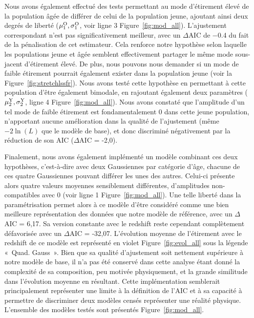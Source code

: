 \documentclass[../main/main.tex]{subfiles}
\begin{document}
Nous avons également effectué des tests permettant au mode d'étirement élevé de
la population âgée de différer de celui de la population jeune, ajoutant ainsi
deux degrés de liberté ($\mu_1^{\rm O}, \sigma_1^{\rm O}$, voir ligne 3
Figure~\ref{fig:mod_all}). L'ajustement correspondant n'est pas
significativement meilleur, avec un $\Delta$AIC de \num{-0.4} du fait de la
pénalisation de cet estimateur. Cela renforce notre hypothèse selon laquelle les
populations jeune et âgée semblent effectivement partager le même mode
sous-jacent d'étirement élevé. De plus, nous pouvons nous demander si un mode de
faible étirement pourrait également exister dans la population jeune (voir la
Figure~\ref{fig:stretchlssfr}). Nous avons testé cette hypothèse en permettant à
cette population d'être également bimodale, en rajoutant également deux
paramètres ($\mu_2^{\rm Y}, \sigma_2^{\rm Y}$, ligne 4
Figure~\ref{fig:mod_all}). Nous avons constaté que l'amplitude d'un tel mode de
faible étirement est fondamentalement 0 dans cette jeune population, n'apportant
aucune amélioration dans la qualité de l'ajustement (même $-2\ln(L)$ que le
modèle de base), et donc discriminé négativement par la réduction de son AIC
($\Delta$AIC = -2,0).

Finalement, nous avons également implémenté un modèle combinant ces deux
hypothèses, c'est-à-dire avec deux Gaussiennes par catégorie d'âge, chacune de
ces quatre Gaussiennes pouvant différer les unes des autres. Celui-ci présente
alors quatre valeurs moyennes sensiblement différentes, d'amplitudes
non-compatibles avec 0 (voir ligne 1 Figure~\ref{fig:mod_all}). Une telle
liberté dans la paramétrisation permet alors à ce modèle d'être considéré comme
une bien meilleure représentation des données que notre modèle de référence,
avec un $\Delta$AIC = 6,17. Sa version constante avec le redshift reste
cependant complètement défavorisée avec un $\Delta$AIC = -32,07. L'évolution
moyenne de l'étirement avec le redshift de ce modèle est représenté en violet
Figure~\ref{fig:evol_all} sous la légende «~Quad. Gauss~». Bien que sa qualité
d'ajustement soit nettement supérieure à notre modèle de base, il n'a pas été
conservé dans cette analyse étant donné la complexité de sa composition, peu
motivée physiquement, et la grande similitude dans l'évolution moyenne en
résultant. Cette implémentation semblerait principalement représenter une limite
à la définition de l'AIC et à sa capacité à permettre de discriminer deux
modèles censés représenter une réalité physique. L'ensemble des modèles testés
sont présentés Figure~\ref{fig:mod_all}.
\end{document}
